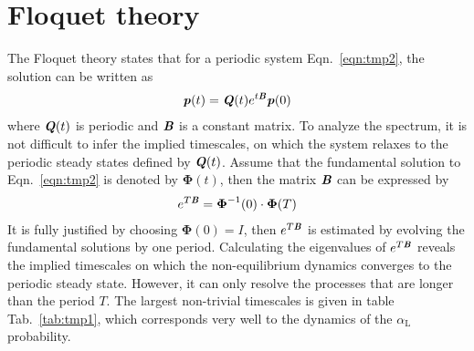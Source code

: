 \documentclass[aps, pre, preprint,unsortedaddress,a4paper,onecolumn]{revtex4-1}
\newcommand{\vect}[1]{\textbf{\textit{#1}}}
\newcommand{\confc}[0]{{\alpha_{\textrm{L}}}}
\begin{document}
\section{Floquet theory}

The Floquet theory states that for a periodic system
Eqn.~\ref{eqn:tmp2}, the solution can be written as
\begin{align}
  \label{eqn:tmp5}
  \vect p(t)  = \vect Q(t) e^{t\vect B} \vect p(0)
\end{align}
where $\vect Q(t)$ is periodic and $\vect B$ is a constant matrix.  To
analyze the spectrum, it is not difficult to infer the implied
timescales, on which the system relaxes to the periodic steady states
defined by $\vect Q(t)$.
Assume that the fundamental solution to Eqn.~\ref{eqn:tmp2} is denoted by $\boldsymbol \Phi(t)$, then
the matrix $\vect B$ can be expressed by
\begin{align}
  e^{T\vect B} = \boldsymbol \Phi^{-1}(0)\cdot \boldsymbol \Phi(T)
\end{align}
It is fully justified by choosing $ \boldsymbol \Phi(0) = I$, then
$e^{T\vect B}$ is estimated by evolving the fundamental solutions by
one period.  Calculating the eigenvalues of $e^{T\vect B}$ reveals the
implied timescales on which the non-equilibrium dynamics converges to
the periodic steady state. However, it can only resolve the processes that are longer than the period $T$.
The largest non-trivial timescales is given in table
Tab.~\ref{tab:tmp1}, which corresponds very well to the dynamics of the  $\confc$ probability.
\end{document}
